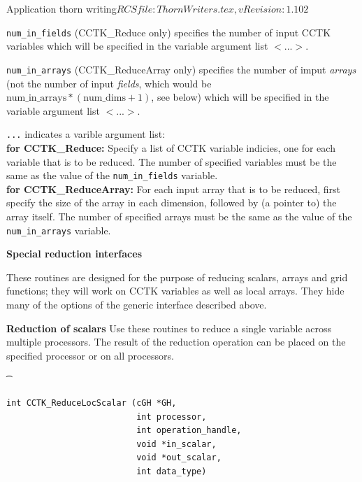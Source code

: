 \begin{cactuspart}{2}{Application thorn writing}{$RCSfile: ThornWriters.tex,v $}{$Revision: 1.102 $}
\begin{Lentry}
\item[{\tt num\_in\_fields}] (CCTK\_Reduce only) specifies the number of input CCTK
variables which will be specified in the variable argument list $<$...$>$.

\item[{\tt num\_in\_arrays}] (CCTK\_ReduceArray only) specifies the
number of imput \emph{arrays} (not the number of input \emph{fields},
which would be $\mathrm{num\_in\_arrays}*(\mathrm{num\_dims}+1)$, see below) which
will be specified in the variable argument list $<$...$>$.

\item[{\tt ...}] indicates a varible argument list:\\
%
\textbf{for CCTK\_Reduce:} Specify a list of CCTK variable indicies,
one for each variable that is to be reduced.  The number of specified
variables must be the same as the value of the {\tt num\_in\_fields}
variable.\\
%
\textbf{for CCTK\_ReduceArray:} For each input array that is to be
reduced, first specify the size of the array in each dimension,
followed by (a pointer to) the array itself.  The number of specified
arrays must be the same as the value of the {\tt num\_in\_arrays}
variable.

\end{Lentry}


\vskip 0.24cm
{\bf Special reduction interfaces}

These routines are designed for the purpose of reducing scalars,
arrays and grid functions; they will work on CCTK variables as well as
local arrays. They hide many of the options of the generic interface
described above.

{\bf Reduction of scalars}  Use these routines to reduce a single
variable across multiple processors.  The result of the reduction
operation can be placed on the specified processor or on all
processors.

{\t
\begin{verbatim}
int CCTK_ReduceLocScalar (cGH *GH,
                          int processor,
                          int operation_handle,
                          void *in_scalar,
                          void *out_scalar,
                          int data_type)


\end{verbatim}}
\end{cactuspart}
